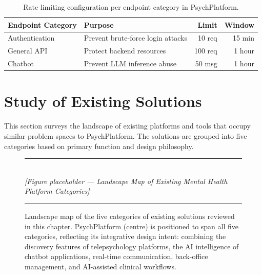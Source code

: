 \begin{table}[H]
  \centering
  \caption{Rate limiting configuration per endpoint category in PsychPlatform.}
  \label{tab:rate-limiters}
  \renewcommand{\arraystretch}{1.35}
  \begin{tabularx}{0.85\linewidth}{@{} l X r r @{}}
    \toprule
    \rowcolor{medgray}
    \textbf{Endpoint Category} & \textbf{Purpose} & \textbf{Limit} & \textbf{Window} \\
    \midrule
    Authentication             & Prevent brute-force login attacks & 10 req  & 15 min \\
    \rowcolor{lightgray}
    General API                & Protect backend resources          & 100 req & 1 hour \\
    Chatbot                    & Prevent LLM inference abuse        & 50 msg  & 1 hour \\
    \bottomrule
  \end{tabularx}
\end{table}

\section{Study of Existing Solutions}
\label{sec:existing}

This section surveys the landscape of existing platforms and tools that occupy
similar problem spaces to PsychPlatform. The solutions are grouped into five
categories based on primary function and design philosophy.

\begin{figure}[H]
  \centering
  \rule{0.85\textwidth}{0.4pt}\\[6pt]
  {\small\itshape [Figure placeholder — Landscape Map of Existing Mental Health Platform Categories]}
  \rule{0.85\textwidth}{0.4pt}
  \caption{Landscape map of the five categories of existing solutions reviewed
           in this chapter. PsychPlatform (centre) is positioned to span all
           five categories, reflecting its integrative design intent: combining
           the discovery features of telepsychology platforms, the AI intelligence
           of chatbot applications, real-time communication, back-office management,
           and AI-assisted clinical workflows.}
  \label{fig:landscape-map}
\end{figure}

